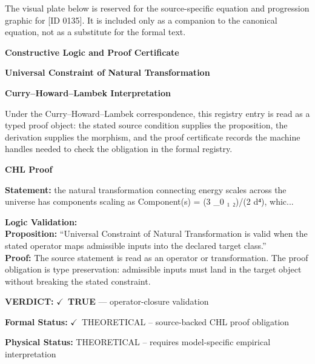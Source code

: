 \begingroup\footnotesize\sloppy
The visual plate below is reserved for the source-specific equation and progression graphic for [ID 0135]. It is included only as a companion to the canonical equation, not as a substitute for the formal text.
\par\endgroup
\ifTZPDarkEdition
{}
\fi

\clearpage
\begingroup\tzpsupportsetup
\noindent\textbf{\fontsize{10.8pt}{12.8pt}\selectfont [ID 0135] Constructive Logic and Proof Certificate}\par
\noindent\textbf{\fontsize{10pt}{12pt}\selectfont Universal Constraint of Natural Transformation}\par
\vspace{0.45em}
\begingroup
\footnotesize
\setlength{\parskip}{0.22em}
\setlength{\parindent}{0pt}
\noindent\textbf{Curry--Howard--Lambek Interpretation}\par
Under the Curry--Howard--Lambek correspondence, this registry entry is read as a typed proof
object: the stated source condition supplies the proposition, the derivation supplies the
morphism, and the proof certificate records the machine handles needed to check the obligation
in the formal registry.

\vspace{0.45em}
\noindent\textbf{CHL Proof}\par
\textbf{Statement:} the natural transformation connecting energy scales across the universe has components
scaling as Component(s) = (3 \_0 ₁ ₂)/(2  d⁴), whic...

\textbf{Logic Validation:}\\
\textbf{Proposition:} ``Universal Constraint of Natural Transformation is valid when the stated operator maps
admissible inputs into the declared target class.''\\
\textbf{Proof:} The source statement is read as an operator or transformation. The proof obligation is
type preservation: admissible inputs must land in the target object without breaking the
stated constraint.

\textbf{VERDICT:} \ensuremath{\checkmark}\ \textbf{TRUE} --- operator-closure validation

\textbf{Formal Status:} \ensuremath{\checkmark}\ THEORETICAL -- source-backed CHL proof obligation

\textbf{Physical Status:} THEORETICAL -- requires model-specific empirical interpretation
\par\vspace{0.45em}
\par
\ifTZPDarkEdition
{}
\fi
\endgroup
\endgroup
